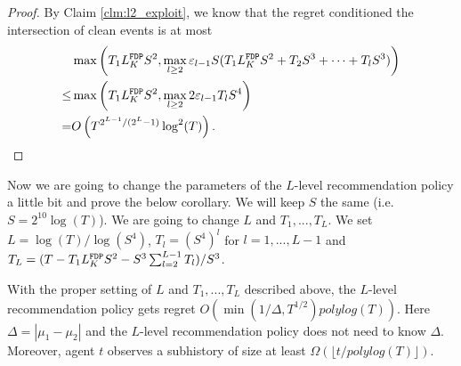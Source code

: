 \begin{proof}
By Claim \ref{clm:l2_exploit}, we know that the regret conditioned the intersection of clean events is at most 
\begin{align*}
&\max\left( T_1L^\mathtt{FDP}_K S^2 , \max_{l \geq 2} \varepsilon_{l-1}S(T_1L^\mathtt{FDP}_K S^2 + T_2 S^3 + \cdots + T_lS^3)\right) \\
\leq & \max\left( T_1L^\mathtt{FDP}_K S^2 , \max_{l \geq 2} 2 \varepsilon_{l-1} T_l S^4 \right)\\
= &O\left(T^{2^{L-1}/(2^L-1)} \log^2(T) \right).
\end{align*}
\end{proof}

Now we are going to change the parameters of the $L$-level recommendation policy a little bit and prove the below corollary. We will keep $S$ the same (i.e. $S = 2^{10}\log(T)$). We are going to change $L$ and $T_1,...,T_L$. We set $L = \log(T)/\log(S^4)$, $T_l = (S^4)^l$ for $l=1,...,L-1$ and $T_L = (T - T_1 L^\mathtt{FDP}_K S^2 - S^3\sum_{l=2}^{L-1} T_l)/S^3$.  

\begin{corollary}
\label{cor:llevel}
With the proper setting of $L$ and $T_1,...,T_L$ described above, the $L$-level recommendation policy gets regret $O(\min(1/\Delta, T^{1/2})polylog(T))$. Here $\Delta = |\mu_1 -\mu_2|$ and the $L$-level recommendation policy does not need to know $\Delta$. Moreover, agent $t$ observes a subhistory of size at least $\Omega( \lfloor t/polylog(T)\rfloor)$. 
\end{corollary}

